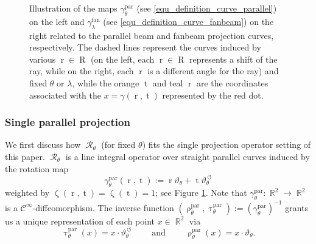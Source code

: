 \documentclass[12pt]{article}
\DeclareMathOperator{\RR}{{\mathbb{R}}}
\DeclareMathOperator{\Radon}{\mathcal{R}}
\DeclareMathOperator{\rotated}{\,\circlearrowleft}
\DeclareMathOperator{\tvariable}{t}
\DeclareMathOperator{\rayvariable}{r}
\DeclareMathOperator{\raygroundset}{R}
\DeclareMathOperator{\tinverse}{\tau}
\DeclareMathOperator{\rayinverse}{\rho}
\DeclareMathOperator{\weightfkt}{\zeta}
\begin{document}
\begin{figure}
\caption{Illustration of the maps $\gamma_{\theta}^\text{par}$ (see \eqref{equ_definition_curve_parallel}) on the left and $\gamma_{\lambda}^\text{fan}$ (see \eqref{equ_definition_curve_fanbeam}) on the right related to the parallel beam and fanbeam projection curves, respectively. The dashed lines represent the curves induced by various $\rayvariable \in \raygroundset$ (on the left, each $\rayvariable\in \raygroundset$ represents a shift of the ray, while on the right, each $\rayvariable$ is a different angle for the ray) and fixed $\theta$ or $\lambda$, while the orange $\tvariable$ and teal $\rayvariable$ are the coordinates associated with the $x=\gamma(\rayvariable,\tvariable)$ represented by the red dot.}
\label{Figure_illustration_parallel_fanbeam}
\end{figure}

\subsubsection*{Single parallel projection}
We first discuss how $\Radon_\theta$ (for fixed $\theta$) fits the single projection operator setting of this paper.
$\Radon_\theta$ is a line integral operator over straight parallel curves induced by the rotation map
\begin{equation}\label{equ_definition_curve_parallel}
\gamma^\textrm{par}_{\theta}(\rayvariable,\tvariable):= \rayvariable\vartheta_{\theta}+\tvariable \vartheta^{\rotated}_{\theta}
\end{equation}
   weighted by  $\weightfkt(\rayvariable,\tvariable)=\weightfkt(\tvariable)=1$; see Figure \ref{Figure_illustration_parallel_fanbeam}. 
Note that $\gamma_\theta^\text{par}\colon \RR^2\to \RR^2$ is a $\mathcal{C}^\infty$-diffeomorphism.
The inverse function $(\rayinverse_{\theta}^{\text{par}},\tinverse_{\theta}^{\text{par}}):=(\gamma_{\theta}^\text{par})^{-1}$ grants us a unique representation of each point $x\in \RR^2$ via  
\begin{equation}
\label{equ_definition_parametrization_inverse_parallel}
\tinverse_{\theta}^{\text{par}}(x)=x \cdot \vartheta^{\rotated}_{\theta} \qquad \text{ and }\qquad \rayinverse_{\theta}^{\text{par}}(x)=x\cdot \vartheta_{\theta}.
\end{equation}
\end{document}
